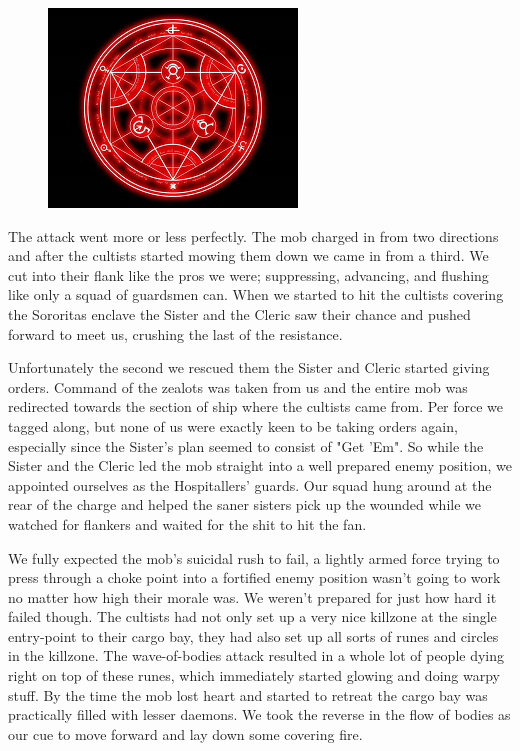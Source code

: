 \begin{figure}
	\begin{center}
		\includegraphics[width=\figwidth]{pics/2/12.png}
	\end{center}
\end{figure}
The attack went more or less perfectly. 
The mob charged in from two directions and after the cultists started mowing them down we came in from a third. 
We cut into their flank like the pros we were; suppressing, advancing, and flushing like only a squad of guardsmen can. 
When we started to hit the cultists covering the Sororitas enclave the Sister and the Cleric saw their chance and pushed forward to meet us, crushing the last of the resistance.

Unfortunately the second we rescued them the Sister and Cleric started giving orders. 
Command of the zealots was taken from us and the entire mob was redirected towards the section of ship where the cultists came from. 
Per force we tagged along, but none of us were exactly keen to be taking orders again, especially since the Sister's plan seemed to consist of "Get 'Em". 
So while the Sister and the Cleric led the mob straight into a well prepared enemy position, we appointed ourselves as the Hospitallers' guards. 
Our squad hung around at the rear of the charge and helped the saner sisters pick up the wounded while we watched for flankers and waited for the shit to hit the fan.

We fully expected the mob's suicidal rush to fail, a lightly armed force trying to press through a choke point into a fortified enemy position wasn't going to work no matter how high their morale was. 
We weren't prepared for just how hard it failed though. 
The cultists had not only set up a very nice killzone at the single entry-point to their cargo bay, they had also set up all sorts of runes and circles in the killzone. 
The wave-of-bodies attack resulted in a whole lot of people dying right on top of these runes, which immediately started glowing and doing warpy stuff. 
By the time the mob lost heart and started to retreat the cargo bay was practically filled with lesser daemons. 
We took the reverse in the flow of bodies as our cue to move forward and lay down some covering fire.


